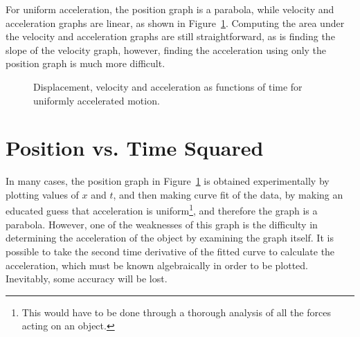 \documentclass[11pt]{article}
\begin{document}
For uniform acceleration, the position graph is a parabola, while velocity and
acceleration graphs are linear, as shown in Figure~\ref{uniform-acceleration}.
Computing the area under the velocity and acceleration graphs are still
straightforward, as is finding the slope of the velocity graph, however,
finding the acceleration using only the position graph is much more difficult.
\begin{figure}[!ht]
  \centering
  \hspace{.15in}
  \hspace{.15in}
  \caption{Displacement, velocity and acceleration as functions of time for
    uniformly accelerated motion.}
  \label{uniform-acceleration}
\end{figure}


\section{Position vs. Time Squared}
In many cases, the position graph in Figure~\ref{uniform-acceleration} is
obtained experimentally by plotting values of $x$ and $t$, and then making
curve fit of the data, by making an educated guess that acceleration is
uniform\footnote{This would have to be done through a thorough analysis of all
  the forces acting on an object.}, and therefore the graph is a parabola.
However, one of the weaknesses of this graph is the difficulty in determining
the acceleration of the object by examining the graph itself. It is possible to
take the second time derivative of the fitted curve to calculate the
acceleration, which must be known algebraically in order to be plotted.
Inevitably, some accuracy will be lost.
\end{document}
